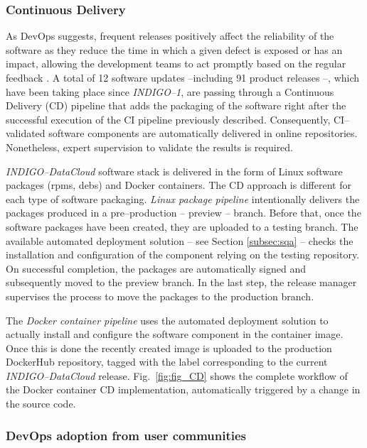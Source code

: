\subsubsection{Continuous Delivery}
As DevOps suggests, frequent releases positively affect the reliability of the software as
they reduce the time in which a given defect is exposed or has an impact, allowing the
development teams to act promptly based on the regular feedback \cite{chen2015}. A total of 12 software
updates --including 91 product releases \cite{indigo-d33}--, which have been taking place since {\sl INDIGO--1}, are passing through
a Continuous Delivery (CD) pipeline that adds the packaging of the software right after the
successful execution of the CI pipeline previously described. Consequently, CI--validated
software components are automatically delivered in online repositories. Nonetheless,
expert supervision to validate the results is required.

{\sl INDIGO--DataCloud} software stack is delivered in the form of Linux software packages (rpms, debs)
and Docker containers. The CD approach is different for each type of software packaging. \textit{Linux
package pipeline} intentionally delivers the packages produced in a pre--production -- preview --
branch. Before that, once the software packages have been created, they are uploaded to a
testing branch. The available automated deployment solution -- see Section \ref{subsec:sqa} -- checks
the installation and configuration of the component relying on the testing repository. On
successful completion, the packages are automatically signed and subsequently moved to
the preview branch.
In the last step, the release manager supervises the process to move the  packages to the
production branch.

The \textit{Docker container pipeline} uses the automated deployment solution to
actually install and configure the software component in the container image. Once this is
done the recently created image is uploaded to the production DockerHub repository, tagged
with the label corresponding to the current {\sl INDIGO--DataCloud} release.
Fig.~\ref{fig:fig_CD} shows the complete workflow of the Docker container CD implementation,
automatically triggered by a change in the source code.


\subsubsection{DevOps adoption from user communities}

